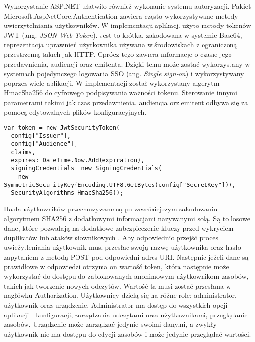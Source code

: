 Wykorzystanie ASP.NET ułatwiło również wykonanie systemu autoryzacji. 
Pakiet Microsoft.AspNetCore.Authentication zawiera często wykorzystywane metody
uwierzytelniania użytkowników. W implementacji aplikacji użyto metody tokenów JWT
(ang. \textit{JSON Web Token}). Jest to krótka, zakodowana w systemie Base64, 
reprezentacja uprawnień użytkownika używana w środowiskach z ograniczoną przestrzenią 
takich jak HTTP\cite{jwt:rfc7519}. Oprócz tego zawiera informacje o
czasie jego przedawnienia, audiencji oraz emitenta. Dzięki temu
może zostać wykorzystany w systemach pojedynczego logowania
SSO (ang. \textit{Single sign-on}) i wykorzystywany poprzez wiele aplikacji.
W implementacji został wykorzystany algorytm HmacSha256 do cyfrowego
podpisywania ważności tokenu. Sterowanie innymi parametrami takimi jak czas
przedawnienia, audiencja orz emitent odbywa się za pomocą edytowalnych
plików konfiguracyjnych.
\begin{lstlisting}[language={[Sharp]C}]
var token = new JwtSecurityToken(
  config["Issuer"],
  config["Audience"],
  claims,
  expires: DateTime.Now.Add(expiration),
  signingCredentials: new SigningCredentials(
    new SymmetricSecurityKey(Encoding.UTF8.GetBytes(config["SecretKey"])),
  SecurityAlgorithms.HmacSha256));
\end{lstlisting} 
Hasła użytkowników przechowywane są po wcześniejszym zakodowaniu algorytmem SHA256
z dodatkowymi informacjami nazywanymi solą. Są to losowe dane, które pozwalają na
dodatkowe zabezpieczenie kluczy przed wykryciem duplikatów lub ataków słownikowych
\cite{anderson2020security}.
Aby odpowiednio przejść proces uwieżytleniania użytkownik musi przesłać
swoją nazwę użytkownika oraz hasło zapytaniem z metodą POST pod odpowiedni adres
URI. Następnie jeżeli dane są prawidłowe w odpowiedzi otrzyma on wartość
token, która następnie może wykorzystać do dostępu do zablokowanych anonimowym
użytkownikom zasobów, takich jak tworzenie nowych odczytów. Wartość
ta musi zostać przesłana w nagłówku Authorization.
Użytkownicy dzielą się na różne role: administrator, użytkownik oraz urządzenie.
Administrator ma dostęp do wszystkich opcji aplikacji - konfiguracji, zarządzania odczytami
oraz użytkownikami, przeglądanie zasobów. Urządzenie może zarządzać jedynie swoimi
danymi, a zwykły użytkownik nie ma dostępu do edycji zasobów i może jedynie przeglądać
wartości.

